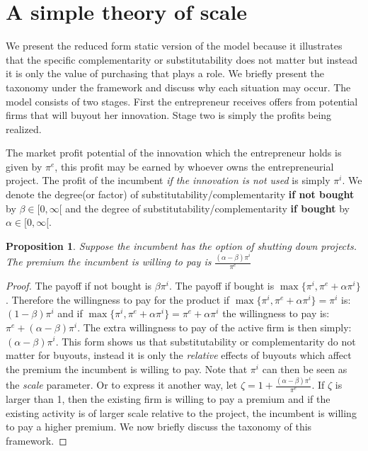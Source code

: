\documentclass[12pt]{report}
\newtheorem{proposition}{Proposition}
\numberwithin{equation}{section}
\begin{document}
\section{A simple theory of scale}


We present the reduced form static version of the model because it illustrates that the specific complementarity or substitutability does not matter but instead it is only the  value of purchasing that plays a role.  We briefly present the taxonomy under the framework and discuss why each situation may occur. The model consists of two stages. First the entrepreneur receives offers from potential firms that will buyout her innovation. Stage two is simply the profits being realized.  

The market profit potential of the innovation which the entrepreneur holds is given by $\pi^e$, this profit may be earned by whoever owns the entrepreneurial project. The profit of the incumbent \textit{if the innovation is not used} is simply $\pi^i$. We denote the degree(or factor) of substitutability/complementarity \textbf{if not bought} by $\beta \in [ 0, \infty [$ and the degree of substitutability/complementarity  \textbf{if bought} by $\alpha \in [0, \infty [ $. 

\begin{proposition}
Suppose the incumbent has the option of shutting down projects. The premium the incumbent is willing to pay is $\frac{(\alpha-\beta)\pi^i}{\pi^e}$
\end{proposition}

\begin{proof}
The payoff if not bought is $ \beta \pi^i$. The payoff if bought is $\max\{ \pi^i, \pi^e + \alpha \pi^i   \}$. Therefore the willingness to pay for the product if  $\max\{ \pi^i, \pi^e + \alpha \pi^i   \} = \pi^i $ is: $(1-\beta) \pi^i$ and if $\max\{ \pi^i, \pi^e + \alpha \pi^i   \} = \pi^e + \alpha \pi^i $ the willingness to pay is: $\pi^e+ (\alpha-\beta) \pi^i$. The extra willingness to pay of the active firm is then simply: $(\alpha-\beta)\pi^i$. This form shows us that substitutability or complementarity do not matter for buyouts, instead it is only the \textit{relative} effects of buyouts which affect the premium the incumbent is willing to pay. Note that $\pi^i$ can then be seen as the \textit{scale} parameter. Or to express it another way, let $\zeta=1 + \frac{(\alpha-\beta)\pi^i}{\pi^e}$. If $\zeta$ is larger than 1, then the existing firm is willing to pay a premium and if the existing activity is of larger scale relative to the project, the incumbent is willing to pay a higher premium. We now briefly discuss the taxonomy of this framework. 
\end{proof}
\end{document}
